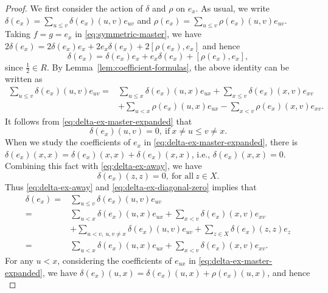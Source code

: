 \documentclass[reqno]{amsart}
\numberwithin{equation}{section}
\theoremstyle{plain}
\theoremstyle{definition}
\begin{document}
\begin{proof}
We first consider the action of $\delta$ and $\rho$ on $e_x$. As usual, we write $\delta(e_x)=\sum_{u\leq v}\delta(e_x)(u,v)e_{uv}$ and
$\rho(e_x)=\sum_{u\leq v} \rho(e_x)(u,v) e_{uv}$.
Taking $f=g=e_x$ in \eqref{eq:symmetric-master}, we have $2\delta(e_x)=2\delta(e_x)e_x+2e_x\delta(e_x)
+2[\rho(e_x),e_x]$ and hence
\begin{equation*}
\delta(e_x)
=\delta(e_x)e_x+e_x\delta(e_x)+[\rho(e_x),e_x],
\end{equation*}
since $\frac{1}{2}\in R$. By Lemma~\ref{lem:coefficient-formulas}, the above identity can be written as
\begin{equation}\label{eq:delta-ex-master-expanded}
\begin{aligned}
\sum_{u\leq v}\delta(e_x)(u,v)e_{uv}
={}&\sum_{u\leq x}\delta(e_x)(u,x)e_{ux}
+\sum_{x\leq v}\delta(e_x)(x,v)e_{xv}\\
&+\sum_{u<x}\rho(e_x)(u,x)e_{ux}
-\sum_{x<v}\rho(e_x)(x,v)e_{xv}.
\end{aligned}
\end{equation}
It follows from \eqref{eq:delta-ex-master-expanded} that
\begin{equation}\label{eq:delta-ex-away}
\delta(e_x)(u,v)=0, ~\text{if}~x\neq u\leq v\neq x.
\end{equation}
When we study the coefficients of $e_{x}$ in \eqref{eq:delta-ex-master-expanded}, there is
$\delta(e_x)(x,x)=\delta(e_x)(x,x)+\delta(e_x)(x,x)$, i.e., $\delta(e_x)(x,x)=0$. Combining this fact
with \eqref{eq:delta-ex-away}, we have
\begin{equation}\label{eq:delta-ex-diagonal-zero}
\delta(e_x)(z,z)=0,~\text{for~all}~z\in X.
\end{equation}
Thus \eqref{eq:delta-ex-away} and \eqref{eq:delta-ex-diagonal-zero} implies that
\begin{align}
\delta(e_x)=&\sum_{u\leq v}\delta(e_x)(u,v)e_{uv}\nonumber\\
=&\sum_{u<x}\delta(e_x)(u,x)e_{ux}+\sum_{x<v}\delta(e_x)(x,v)e_{xv}\nonumber\\
&+\sum_{u<v,~u,v\neq x}\delta(e_x)(u,v)e_{uv}+\sum_{z\in X}\delta(e_x)(z,z)e_{z}\nonumber\\
=&\sum_{u<x}\delta(e_x)(u,x)e_{ux}
+\sum_{x<v}\delta(e_x)(x,v)e_{xv}.\label{eq:delta-ex0}
\end{align}
For any $u<x$, considering the coefficients of $e_{ux}$ in \eqref{eq:delta-ex-master-expanded}, we have
$\delta(e_x)(u,x)=\delta(e_x)(u,x)+\rho(e_x)(u,x)$,
and hence
\begin{equation}\label{eq:rho-ex-incoming-zero}

\end{equation}
\end{proof}
\end{document}
